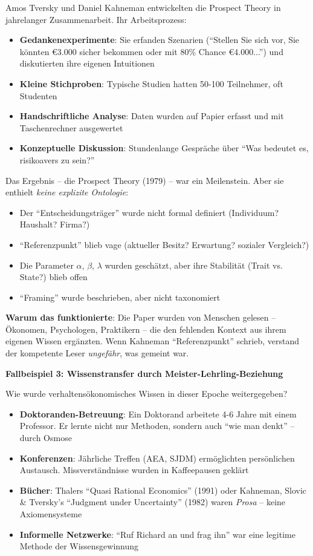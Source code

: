 Amos Tversky und Daniel Kahneman entwickelten die Prospect Theory in jahrelanger Zusammenarbeit. Ihr Arbeitsprozess:
\begin{itemize}
    \item \textbf{Gedankenexperimente}: Sie erfanden Szenarien (``Stellen Sie sich vor, Sie könnten €3.000 sicher bekommen oder mit 80\% Chance €4.000...'') und diskutierten ihre eigenen Intuitionen
    \item \textbf{Kleine Stichproben}: Typische Studien hatten 50-100 Teilnehmer, oft Studenten
    \item \textbf{Handschriftliche Analyse}: Daten wurden auf Papier erfasst und mit Taschenrechner ausgewertet
    \item \textbf{Konzeptuelle Diskussion}: Stundenlange Gespräche über ``Was bedeutet es, risikoavers zu sein?''
\end{itemize}

Das Ergebnis -- die Prospect Theory (1979) -- war ein Meilenstein. Aber sie enthielt \textit{keine explizite Ontologie}:
\begin{itemize}
    \item Der ``Entscheidungsträger'' wurde nicht formal definiert (Individuum? Haushalt? Firma?)
    \item ``Referenzpunkt'' blieb vage (aktueller Besitz? Erwartung? sozialer Vergleich?)
    \item Die Parameter $\alpha$, $\beta$, $\lambda$ wurden geschätzt, aber ihre Stabilität (Trait vs. State?) blieb offen
    \item ``Framing'' wurde beschrieben, aber nicht taxonomiert
\end{itemize}

\textbf{Warum das funktionierte}: Die Paper wurden von Menschen gelesen -- Ökonomen, Psychologen, Praktikern -- die den fehlenden Kontext aus ihrem eigenen Wissen ergänzten. Wenn Kahneman ``Referenzpunkt'' schrieb, verstand der kompetente Leser \textit{ungefähr}, was gemeint war.

\textbf{Fallbeispiel 3: Wissenstransfer durch Meister-Lehrling-Beziehung}

Wie wurde verhaltensökonomisches Wissen in dieser Epoche weitergegeben?
\begin{itemize}
    \item \textbf{Doktoranden-Betreuung}: Ein Doktorand arbeitete 4-6 Jahre mit einem Professor. Er lernte nicht nur Methoden, sondern auch ``wie man denkt'' -- durch Osmose
    \item \textbf{Konferenzen}: Jährliche Treffen (AEA, SJDM) ermöglichten persönlichen Austausch. Missverständnisse wurden in Kaffeepausen geklärt
    \item \textbf{Bücher}: Thalers ``Quasi Rational Economics'' (1991) oder Kahneman, Slovic \& Tversky's ``Judgment under Uncertainty'' (1982) waren \textit{Prosa} -- keine Axiomensysteme
    \item \textbf{Informelle Netzwerke}: ``Ruf Richard an und frag ihn'' war eine legitime Methode der Wissensgewinnung
\end{itemize}

